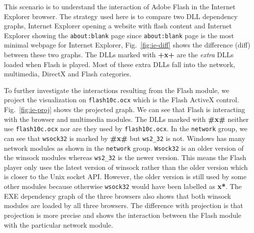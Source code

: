 This scenario is to understand the interaction of Adobe Flash in
the Internet Explorer browser.
The strategy used here is to compare two DLL dependency graphs,
Internet Explorer opening a website with flash content and
Internet Explorer showing the {\tt about:blank} page since
{\tt about:blank} page is the most minimal webpage for Internet Explorer,
Fig.~\ref{fig:ie-diff} shows the difference (diff) between these two
graphs.
The DLLs marked with {\bf +x+} are the {\em extra} DLLs loaded
when Flash is played.
Most of these extra DLLs fall into the
network, multimedia, DirectX and Flash categories.

To further investigate the interactions resulting from the Flash module,
we project the visualization on {\tt flash10c.ocx} which is
the Flash ActiveX control.
Fig.~\ref{fig:ie-proj} shows the projected graph.
We can see that Flash is interacting with the browser and multimedia modules.
The DLLs marked with {\bf \#x\#} neither use {\tt flash10c.ocx}
nor are they used by {\tt flash10c.ocx}.
In the {\tt network} group,
we can see that {\tt wsock32} is marked by {\bf \#x\#} but
{\tt ws2\_32} is not.
Windows has many network modules as shown in the {\tt network} group.
{\tt Wsock32} is an
older version of the winsock modules whereas {\tt ws2\_32} is the newer version.
This means the Flash player only uses the latest version of winsock rather
than the older version which is closer to the Unix socket API.
However, the older version is still used by some other modules
because otherwise {\tt wsock32} would have been labelled as {\bf *x*}.
The EXE dependency graph of the three browsers also shows that
both winsock modules are loaded by all three browsers.
The difference with projection is that projection is
more precise and shows the interaction between
the Flash module with the particular network module.
